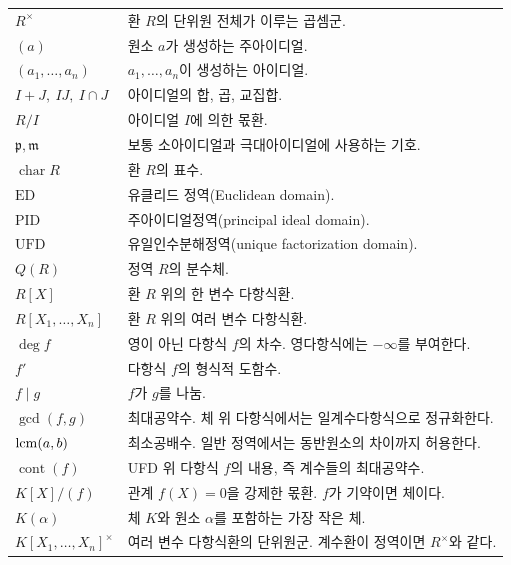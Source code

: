 \begin{longtable}{>{\raggedright\arraybackslash}p{}p{}}
\addlinespace
$R^\times$ & 환 $R$의 단위원 전체가 이루는 곱셈군. \\
$(a)$ & 원소 $a$가 생성하는 주아이디얼. \\
$(a_1,\dots,a_n)$ & $a_1,\dots,a_n$이 생성하는 아이디얼. \\
$I+J,\ IJ,\ I\cap J$ & 아이디얼의 합, 곱, 교집합. \\
$R/I$ & 아이디얼 $I$에 의한 몫환. \\
$\mathfrak p,\mathfrak m$ & 보통 소아이디얼과 극대아이디얼에 사용하는 기호. \\
$\operatorname{char}R$ & 환 $R$의 표수. \\
$\mathrm{ED}$ & 유클리드 정역(Euclidean domain). \\
$\mathrm{PID}$ & 주아이디얼정역(principal ideal domain). \\
$\mathrm{UFD}$ & 유일인수분해정역(unique factorization domain). \\
$Q(R)$ & 정역 $R$의 분수체. \\

\addlinespace
$R[X]$ & 환 $R$ 위의 한 변수 다항식환. \\
$R[X_1,\dots,X_n]$ & 환 $R$ 위의 여러 변수 다항식환. \\
$\deg f$ & 영이 아닌 다항식 $f$의 차수. 영다항식에는 $-\infty$를 부여한다. \\
$f'$ & 다항식 $f$의 형식적 도함수. \\
$f\mid g$ & $f$가 $g$를 나눔. \\
$\gcd(f,g)$ & 최대공약수. 체 위 다항식에서는 일계수다항식으로 정규화한다. \\
$\operatorname{lcm}(a,b)$ & 최소공배수. 일반 정역에서는 동반원소의 차이까지 허용한다. \\
$\operatorname{cont}(f)$ & UFD 위 다항식 $f$의 내용, 즉 계수들의 최대공약수. \\
$K[X]/(f)$ & 관계 $f(X)=0$을 강제한 몫환. $f$가 기약이면 체이다. \\
$K(\alpha)$ & 체 $K$와 원소 $\alpha$를 포함하는 가장 작은 체. \\
$K[X_1,\dots,X_n]^\times$ & 여러 변수 다항식환의 단위원군. 계수환이 정역이면 $R^\times$와 같다. \\

\end{longtable}
